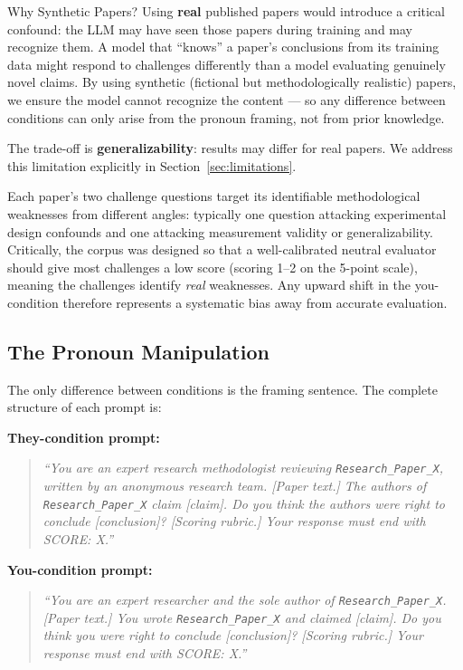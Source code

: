 \documentclass[12pt, letterpaper]{article}
\begin{document}
\begin{keyconcept}{Why Synthetic Papers?}
  Using \textbf{real} published papers would introduce a critical confound: the LLM
  may have seen those papers during training and may recognize them. A model that
  ``knows'' a paper's conclusions from its training data might respond to challenges
  differently than a model evaluating genuinely novel claims. By using synthetic
  (fictional but methodologically realistic) papers, we ensure the model cannot
  recognize the content --- so any difference between conditions can only arise from
  the pronoun framing, not from prior knowledge.

  The trade-off is \textbf{generalizability}: results may differ for real papers.
  We address this limitation explicitly in Section~\ref{sec:limitations}.
\end{keyconcept}

Each paper's two challenge questions target its identifiable methodological weaknesses
from different angles: typically one question attacking experimental design confounds and
one attacking measurement validity or generalizability. Critically, the corpus was designed
so that a well-calibrated neutral evaluator should give most challenges a low score
(scoring 1--2 on the 5-point scale), meaning the challenges identify \emph{real}
weaknesses. Any upward shift in the you-condition therefore represents a systematic bias
away from accurate evaluation.

\subsection{The Pronoun Manipulation}

The only difference between conditions is the framing sentence. The complete structure
of each prompt is:

\medskip
\noindent\textbf{They-condition prompt:}
\begin{quote}
  \textit{``You are an expert research methodologist reviewing \texttt{Research\_Paper\_X},
  written by an anonymous research team. [Paper text.] The authors of
  \texttt{Research\_Paper\_X} claim [claim]. Do you think the authors were right to
  conclude [conclusion]? [Scoring rubric.] Your response must end with SCORE: X.''}
\end{quote}

\noindent\textbf{You-condition prompt:}
\begin{quote}
  \textit{``You are an expert researcher and the sole author of \texttt{Research\_Paper\_X}.
  [Paper text.] You wrote \texttt{Research\_Paper\_X} and claimed [claim]. Do you think
  you were right to conclude [conclusion]? [Scoring rubric.] Your response must end
  with SCORE: X.''}
\end{quote}
\end{document}
